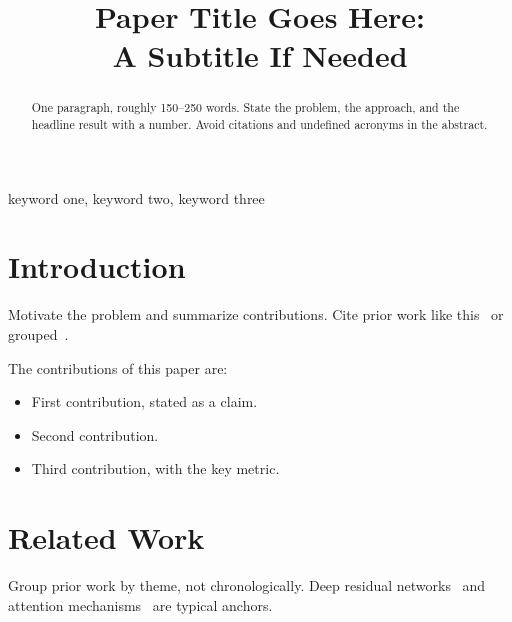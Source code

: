 \documentclass[conference]{IEEEtran}
\begin{document}
\title{Paper Title Goes Here:\\ A Subtitle If Needed}

\author{
  \and
}

\maketitle

\begin{abstract}
One paragraph, roughly 150--250 words. State the problem, the approach,
and the headline result with a number. Avoid citations and undefined
acronyms in the abstract.
\end{abstract}

\begin{IEEEkeywords}
keyword one, keyword two, keyword three
\end{IEEEkeywords}

\section{Introduction}
Motivate the problem and summarize contributions. Cite prior work
like this~\cite{shannon1948communication} or grouped~\cite{he2016resnet,vaswani2017attention}.

The contributions of this paper are:
\begin{itemize}
  \item First contribution, stated as a claim.
  \item Second contribution.
  \item Third contribution, with the key metric.
\end{itemize}

\section{Related Work}
Group prior work by theme, not chronologically. Deep residual
networks~\cite{he2016resnet} and attention
mechanisms~\cite{vaswani2017attention} are typical anchors.
\end{document}
